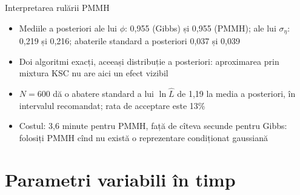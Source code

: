 \begin{frame}{Interpretarea rulării PMMH}
\itemsize{\small}
\begin{itemize}
    \item Mediile a posteriori ale lui $\phi$: 0{,}955 (Gibbs) și 0{,}955 (PMMH); ale lui $\sigma_\eta$: 0{,}219 și 0{,}216; abaterile standard a posteriori 0{,}037 și 0{,}039
    \item Doi algoritmi exacți, aceeași distribuție a posteriori: aproximarea prin mixtura KSC nu are aici un efect vizibil
    \item $N = 600$ dă o abatere standard a lui $\ln\hat L$ de 1{,}19 la media a posteriori, în intervalul recomandat; rata de acceptare este 13\%
    \item Costul: 3{,}6 minute pentru PMMH, față de cîteva secunde pentru Gibbs: folosiți PMMH cînd nu există o reprezentare condiționat gaussiană
\end{itemize}
\end{frame}


\section{Parametri variabili în timp}

